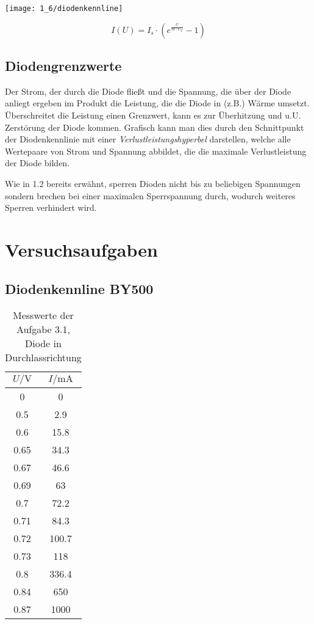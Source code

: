 \documentclass[a4paper, 12pt]{article}
\begin{document}
\begin{center}
  \texttt{[image: 1\_6/diodenkennline]}
\end{center}

$$ I(U) = I_s \cdot (e^{\frac{U}{m \cdot U_T} }-1)$$


\subsection{Diodengrenzwerte}

Der Strom, der durch die Diode fließt und die Spannung, die über der Diode
anliegt ergeben im Produkt die Leistung, die die Diode in (z.B.) Wärme umsetzt.
Überschreitet die Leistung einen Grenzwert, kann es zur Überhitzung und u.U.
Zerstörung der Diode kommen. Grafisch kann man dies durch den Schnittpunkt der
Diodenkennlinie mit einer
\emph{Verlustleistungshyperbel} darstellen, welche alle Wertepaare von Strom und
Spannung abbildet, die die maximale Verlustleistung der Diode bilden.

Wie in 1.2 bereits erwähnt, sperren Dioden nicht bis zu beliebigen Spannungen
sondern brechen bei einer maximalen Sperrspannung durch, wodurch weiteres
Sperren verhindert wird.


\pagebreak

  \clearpage
\setcounter{page}{1}

\setcounter{section}{0}
\section{Versuchsaufgaben}


\subsection{Diodenkennline BY500}
\begin{table}[H]
\begin{center}
\begin{tabular}{@{}c|c@{}}
\toprule
$U / \si{\volt}$    & $I / \si{\milli\ampere}$     \\ \midrule
0    & 0     \\
0.5  & 2.9   \\
0.6  & 15.8  \\
0.65 & 34.3  \\
0.67 & 46.6  \\
0.69 & 63    \\
0.7  & 72.2  \\
0.71 & 84.3  \\
0.72 & 100.7 \\
0.73 & 118   \\
0.8  & 336.4 \\
0.84 & 650   \\
0.87 & 1000  \\ \bottomrule
\end{tabular}
\end{center}
\caption{Messwerte der Aufgabe 3.1, Diode in Durchlassrichtung}
\end{table}
\end{document}
